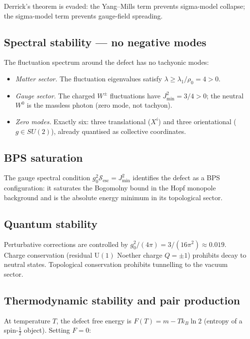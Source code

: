 \documentclass[12pt]{article}
\theoremstyle{definition}
\theoremstyle{remark}
\begin{document}
Derrick's theorem is evaded: the Yang--Mills term prevents sigma-model
collapse; the sigma-model term prevents gauge-field spreading.

\subsection{Spectral stability — no negative modes}

The fluctuation spectrum around the defect has no tachyonic modes:
\begin{itemize}
\item \emph{Matter sector.}  The fluctuation eigenvalues satisfy
  $\lambda\geq\lambda_1/\rho_0=4>0$.
\item \emph{Gauge sector.}  The charged $W^\pm$ fluctuations have
  $J^2_{\min}=3/4>0$; the neutral $W^0$ is the massless photon (zero mode,
  not tachyon).
\item \emph{Zero modes.}  Exactly six: three translational ($X^i$) and three
  orientational ($g\in SU(2)$), already quantised as collective coordinates.
\end{itemize}

\subsection{BPS saturation}

The gauge spectral condition $g_0^2\mathcal{S}_{\mathrm{esc}}=J^2_{\min}$
identifies the defect as a BPS configuration: it saturates the Bogomolny
bound in the Hopf monopole background and is the absolute energy minimum
in its topological sector.

\subsection{Quantum stability}

Perturbative corrections are controlled by $g_0^2/(4\pi)=3/(16\pi^2)\approx
0.019$.  Charge conservation (residual $\mathrm{U}(1)$ Noether charge $Q=\pm 1$)
prohibits decay to neutral states.  Topological conservation prohibits
tunnelling to the vacuum sector.

\subsection{Thermodynamic stability and pair production}

At temperature $T$, the defect free energy is
$F(T)=m-Tk_B\ln 2$ (entropy of a spin-$\tfrac{1}{2}$ object).
Setting $F=0$:
\end{document}
